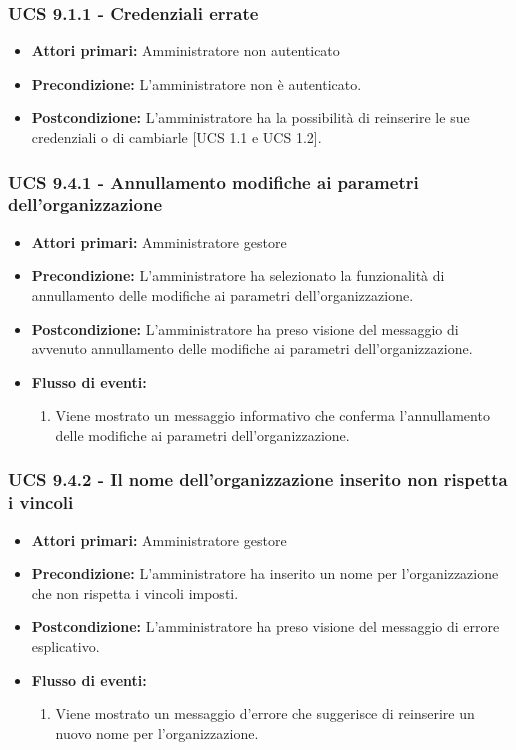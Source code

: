 \subsubsection{UCS 9.1.1 - Credenziali errate}%
\begin{itemize}
\item \textbf{Attori primari:} Amministratore non autenticato
\item \textbf{Precondizione:} L'amministratore non è autenticato.
\item \textbf{Postcondizione:} L'amministratore ha la possibilità di reinserire le sue credenziali o di cambiarle [UCS 1.1 e UCS 1.2].
\end{itemize}


\subsubsection{UCS 9.4.1 - Annullamento modifiche ai parametri dell'organizzazione}%
\begin{itemize}
\item \textbf{Attori primari:} Amministratore gestore
\item \textbf{Precondizione:} L'amministratore ha selezionato la funzionalità di annullamento delle modifiche ai parametri dell'organizzazione.
\item \textbf{Postcondizione:} L'amministratore ha preso visione del messaggio di avvenuto annullamento delle modifiche ai parametri dell'organizzazione.
\item \textbf{Flusso di eventi:}
    \begin{enumerate}
    \item Viene mostrato un messaggio informativo che conferma l'annullamento delle modifiche ai parametri dell'organizzazione.
    \end{enumerate} 
\end{itemize}

\subsubsection{UCS 9.4.2 - Il nome dell'organizzazione inserito non rispetta i vincoli}%
\begin{itemize}
\item \textbf{Attori primari:} Amministratore gestore
\item \textbf{Precondizione:} L'amministratore ha inserito un nome per l'organizzazione che non rispetta i vincoli imposti.
\item \textbf{Postcondizione:} L'amministratore ha preso visione del messaggio di errore esplicativo.
\item \textbf{Flusso di eventi:}
    \begin{enumerate}
    \item Viene mostrato un messaggio d'errore che suggerisce di reinserire un nuovo nome per l'organizzazione.
    \end{enumerate} 
\end{itemize}

